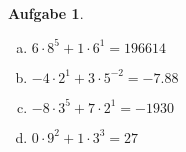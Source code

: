 \documentclass[12pt,fleqn]{article}
\theoremstyle{aufg}
\newtheorem{aufgabe}{Aufgabe}
\theoremstyle{bsp}
\begin{document}
\begin{flushleft}
\begin{aufgabe}
\begin{multicols}{2} 
\begin{enumerate}[a)] 
\item 
$6\cdot8^{5}+1\cdot6^{1}=$$196614$
\item 
$-4\cdot2^{1}+3\cdot5^{-2}=$$-7.88$
\item 
$-8\cdot3^{5}+7\cdot2^{1}=$$-1930$
\item 
$0\cdot9^{2}+1\cdot3^{3}=$$27$
\end{enumerate} 
\end{multicols} 
\end{aufgabe} 
\end{flushleft} 
\end{document}
